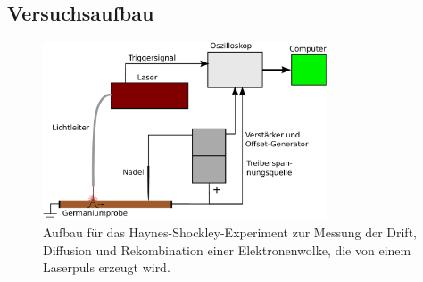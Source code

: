 \subsection{Versuchsaufbau}

\begin{figure}[H]
\begin{center}
  \includegraphics[width=0.75\textwidth]{../img/aufbau1.pdf}
  \caption{Aufbau für das Haynes-Shockley-Experiment zur Messung der Drift, Diffusion und Rekombination einer
  Elektronenwolke, die von einem Laserpuls erzeugt wird.}
  \label{img:lab}
\end{center}
\end{figure}